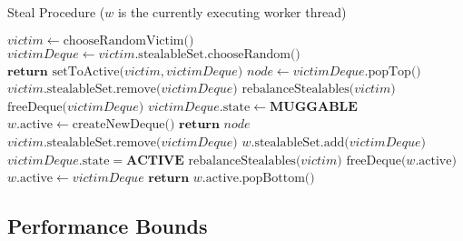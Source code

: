 \documentclass[bsc,frontabs,singlespacing,parskip,deptreport,normalheadings]{infthesis}
\begin{document}
\begin{algorithm}
\caption{Steal Procedure ($w$ is the currently executing worker thread)}\label{alg:steal}
\begin{algorithmic}[1]
            \State $victim \gets \text{chooseRandomVictim()} $
            \State $ victimDeque \gets victim \text{.stealableSet.chooseRandom()} $
                \label{line:choose_random}
                \State $ \textbf{return } \text{setToActive(} victim, victimDeque \text{)}$ 
            \EndIf
            \State $ node \gets victimDeque \text{.popTop()} $
                \State $ victim \text{.stealableSet.remove(} victimDeque \text{)} $
                \State $ \text{rebalanceStealables(} victim \text{)} $
                    \label{line:rebalance_1}
                    \State $ \text{freeDeque(} victimDeque \text{)} $
                \EndIf
                \State $victimDeque\text{.state} \gets \textbf{MUGGABLE}$
            \EndIf
                    \State $w \text{.active} \gets \text{createNewDeque()}$
                \EndIf
                \State $ \textbf{return } node $
            \EndIf
        \EndWhile
    \EndFunction
        \State $ victim \text{.stealableSet.remove(} victimDeque \text{)} $
        \State $ w \text{.stealableSet.add(} victimDeque \text{)} $
        \State $ victimDeque \text{.state} = \textbf{ACTIVE} $
        \State $ \text{rebalanceStealables(} victim \text{)} $
            \label{line:rebalance_2}
            \State $ \text{freeDeque(} w \text{.active)} $
        \EndIf
        \State $ w \text{.active} \gets victimDeque $
        \State $ \textbf{return } w \text{.active.popBottom()} $
    \EndFunction
\end{algorithmic}
\end{algorithm}

\subsection{Performance Bounds}
\label{subsection:performance_bounds}
\end{document}
